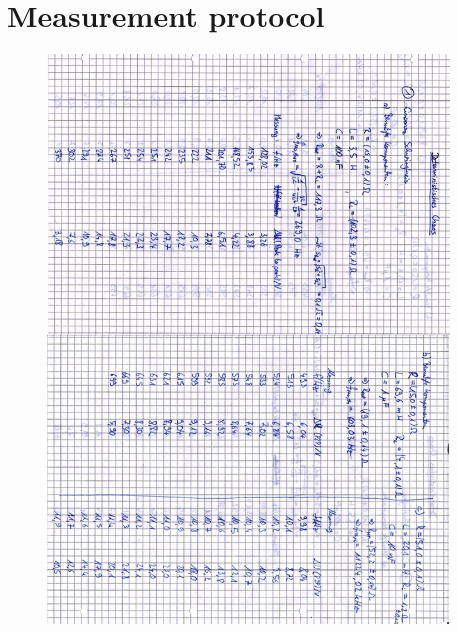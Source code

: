 \clearpage
\appendix
\section{Measurement protocol}

\begin{figure}[H]
\centering \includegraphics[width=0.95\textwidth]{Bilder/anh1.jpg}
\end{figure}

